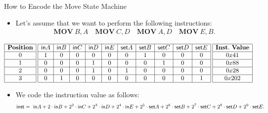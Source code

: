 \begin{frame}[allowframebreaks]{How to Encode the Move State Machine}
\begin{itemize}
\small
\item Let's assume that we want to perform the following instructions:
\begin{align*}
\mathbf{MOV}~B, A \quad \mathbf{MOV}~C, D \quad \mathbf{MOV}~A, D \quad \mathbf{MOV}~E,B.
\end{align*}
\end{itemize}
\[
\begin{array}{|c|}
\hline
\mathbf{Position} \\ \hline
0 \\ \hline
1 \\ \hline
2 \\ \hline
3 \\ \hline
\end{array}
\hspace{0.1cm}
\begin{array}{|c|c|c|c|c|c|c|c|c|c|}
\hline
\mathsf{in} A & \mathsf{in} B & \mathsf{in} C & \mathsf{in} D & \mathsf{in} E & \mathsf{set} A & \mathsf{set} B & \mathsf{set} C & \mathsf{set} D & \mathsf{set} E \\ \hline
1 & 0 & 0 & 0 & 0 & 0 & 1 & 0 & 0 & 0 \\ \hline
0 & 0 & 0 & 1 & 0 & 0 & 0 & 1 & 0 & 0 \\ \hline
0 & 0 & 0 & 1 & 0 & 1 & 0 & 0 & 0 & 0 \\ \hline
0 & 1 & 0 & 0 & 0 & 0 & 0 & 0 & 0 & 1 \\ \hline
\end{array}
\hspace{0.1cm}
\begin{array}{|c|}
\hline
\mathbf{Inst.~Value} \\ \hline
0x41 \\ \hline
0x88 \\ \hline
0x28 \\ \hline
0x202 \\ \hline
\end{array}
\]
\begin{itemize}
\vspace{-0.1cm}
\item We code the instruction value as follows:
\[
\mathsf{inst} = ~\mathsf{in} A + 2 \cdot \mathsf{in} B + 2^2 \cdot \mathsf{in} C + 2^3 \cdot \mathsf{in} D + 2^4 \cdot \mathsf{in} E + 2^5 \cdot \mathsf{set} A + 2^6 \cdot \mathsf{set} B + 2^7 \cdot \mathsf{set} C + 2^8 \cdot \mathsf{set} D + 2^9 \cdot \mathsf{set} E.
\]


\end{itemize}
\end{frame}
